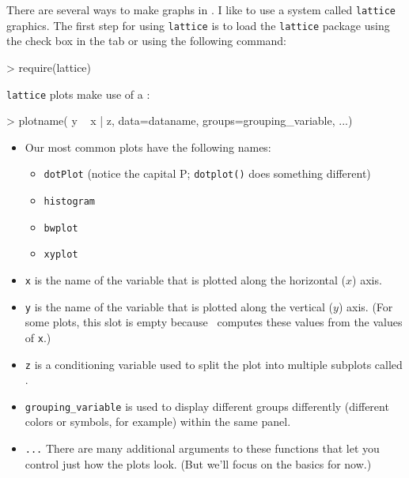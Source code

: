 There are several ways to make graphs in \R.  I like to use a system called
\verb!lattice! graphics.  The first step for using \verb!lattice! is to
load the \verb!lattice! package using the check box in the  tab or using
the following command:

\begin{Schunk}
\begin{Sinput}
> require(lattice)
\end{Sinput}
\end{Schunk}
\verb!lattice! plots make use of a :

\begin{Schunk}
\begin{Sinput}
> plotname( y ~ x | z, data=dataname, groups=grouping_variable, ...)
\end{Sinput}
\end{Schunk}
\begin{itemize}
\item
Our most common plots have the following names:
\begin{itemize}
\item \verb!dotPlot! (notice the capital P; \verb!dotplot()! does something different)
\item \verb!histogram!
\item \verb!bwplot!
\item \verb!xyplot!
\end{itemize}
\item
\verb!x! is the name of the variable that is plotted along the horizontal 
($x$) axis.
\item
\verb!y! is the name of the variable that is plotted along the vertical ($y$) 
axis.  (For some plots, this slot is empty because \R\ computes these values
from the values of \verb!x!.)
\item
\verb!z! is a conditioning variable used to split the plot into 
multiple subplots called .
\item
\verb!grouping_variable! is used to display different groups differently
(different colors or symbols, for example) within the same panel.
\item
\verb!...! There are many additional arguments to these functions that let you
control just how the plots look.  (But we'll focus on the basics for now.)
\end{itemize}


